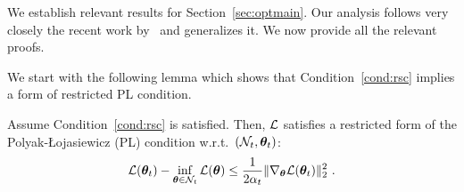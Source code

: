 
We establish relevant results for Section~\ref{sec:optmain}. Our analysis follows very closely the recent work by~\citet{banerjee2022restricted} and generalizes it. We now provide all the relevant proofs.

We start with the following lemma which shows that Condition~\ref{cond:rsc} implies a form of restricted PL condition. 
%
\begin{lemm}[{\bf Restricted PL}]\label{lemm:RPL}
Assume Condition~\ref{cond:rsc} is satisfied. Then, ${\mathcal{L}}$ satisfies a restricted form of the Polyak-Łojasiewicz (PL) condition w.r.t.~$(\mathcal{N}_t,{\bm{\theta}}_t)$: 
\begin{equation}
\label{eq:RPL}
{\mathcal{L}}({\bm{\theta}}_t) - \inf_{{\bm{\theta}} \in \mathcal{N}_t} {\mathcal{L}}({\bm{\theta}}) \leq \frac{1}{2\alpha_t} \| \nabla_{\bm{\theta}}{\mathcal{L}}({\bm{\theta}}_t) \|_2^2~.
\end{equation}
\label{lemm:rsc2}
\end{lemm}
